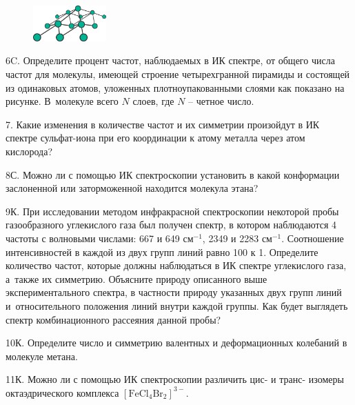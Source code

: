 \par
\begin{figure} %
    \centering
    \vspace{-0.7ex}
    \includegraphics[width=28mm]{images/Fig_2_4_5.png}
    \vspace{-2ex}
\end{figure}
6C. Определите процент частот, наблюдаемых в ИК спектре, от общего числа частот для молекулы, имеющей строение четырехгранной пирамиды и состоящей из одинаковых атомов, уложенных плотноупакованными слоями как показано на рисунке. В~молекуле всего $N$ слоев, где $N$ – четное число.
\par
7. Какие изменения в количестве частот и их симметрии произойдут в ИК спектре сульфат-иона при его координации к атому металла через атом кислорода?
\par
8С. Можно ли с помощью ИК спектроскопии установить в какой конформации заслоненной или заторможенной находится молекула этана?
\par
9К. При исследовании методом инфракрасной спектроскопии некоторой пробы газообразного углекислого газа был получен спектр, в котором наблюдаются 4 частоты с волновыми числами: 667 и 649 см$^{-1}$, 2349 и 2283 см$^{-1}$. Соотношение интенсивностей в каждой из двух групп линий равно 100 к 1. Определите количество частот, которые должны наблюдаться в ИК спектре углекислого газа, а~также их симметрию. Объясните природу описанного выше экспериментального спектра, в частности природу указанных двух групп линий и относительного положения линий внутри каждой группы. Как будет выглядеть спектр комбинационного рассеяния данной пробы?
\par
10К. Определите число и симметрию валентных и деформационных колебаний в молекуле метана.
\par
11К. Можно ли с помощью ИК спектроскопии различить цис- и транс- изомеры октаэдрического комплекса $[\text{FeCl}_4\text{Br}_2]^{3-}$. 
\par